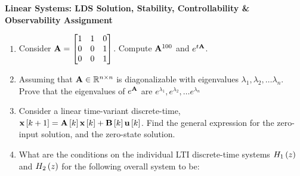 \documentclass[9pt]{article}
\def\mf{\ensuremath\mathbf}
\def\mb{\ensuremath\mathbb}
\def\lp{\ensuremath\left(}
\def\rp{\ensuremath\right)}
\def\ls{\ensuremath\left[}
\def\rs{\ensuremath\right]}
\def\bmx{\ensuremath\begin{bmatrix*}[r]}
\def\emx{\ensuremath\end{bmatrix*}}
\newcommand{\ct}[1]{\lp #1\rp}
\newcommand{\dt}[1]{\ls #1\rs}
\begin{document}
\begin{center}
\begin{Large}
\textbf{Linear Systems: LDS Solution, Stability, Controllability \&  Observability Assignment}
\end{Large}
\end{center}
\vspace{0.2cm}

\begin{multicols}{2}

\begin{enumerate}[resume]
    \item Consider $\mf{A} = \bmx 1 & 1 & 0\\ 0 & 0 & 1\\ 0 & 0 & 1\emx$. Compute $\mf{A}^{100}$ and $e^{t\mf{A}}$.

    \item Assuming that $\mf{A} \in \mb{R}^{n \times n}$ is diagonalizable with eigenvalues $\lambda_1, \lambda_2,\ldots \lambda_n$. Prove that the eigenvalues of $e^{\mf{A}}$ are $e^{\lambda_1}, e^{\lambda_2}, \ldots e^{\lambda_n}$

    \item Consider a linear time-variant discrete-time, $\mf{x}\dt{k+1} = \mf{A}\dt{k}\mf{x}\dt{k} + \mf{B}\dt{k}\mf{u}\dt{k}$. Find the general expression for the zero-input solution, and the zero-state solution.

    \item What are the conditions on the individual LTI discrete-time systems $H_1\ct{z}$ and $H_2\ct{z}$ for the following overall system to be:
    \begin{center}


\end{center}
\end{enumerate}
\end{multicols}
\end{document}

